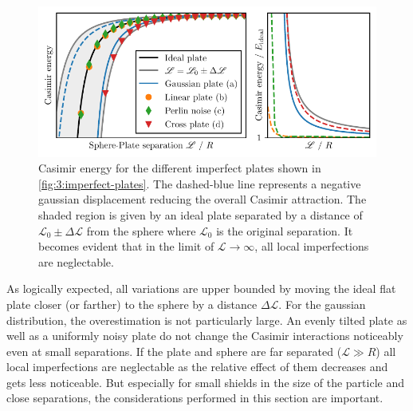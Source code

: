 \begin{figure}[!htbp]
  \centering
  \includegraphics[width=\textwidth]{../figures/casimir/casimir-potential-imperfect-plates-relative.pdf}
  \caption{Casimir energy for the different imperfect plates shown in \cref{fig:3:imperfect-plates}. The dashed-blue line represents a negative gaussian displacement reducing the overall Casimir attraction. The shaded region is given by an ideal plate separated by a distance of $\mathscr{L}_0 \pm \Delta\mathscr{L}$ from the sphere where $\mathscr{L}_0$ is the original separation. It becomes evident that in the limit of $\mathscr{L}\rightarrow\infty$, all local imperfections are neglectable.}
  \label{fig:3:casimir-imperfect-plates}
\end{figure}
As logically expected, all variations are upper bounded by moving the ideal flat plate closer (or farther) to the sphere by a distance $\Delta \mathscr{L}$.
For the gaussian distribution, the overestimation is not particularly large.
An evenly tilted plate as well as a uniformly noisy plate do not change the Casimir interactions noticeably even at small separations.
If the plate and sphere are far separated ($\mathscr{L} \gg R$) all local imperfections are neglectable as the relative effect of them decreases and gets less noticeable.
But especially for small shields in the size of the particle and close separations, the considerations performed in this section are important.
